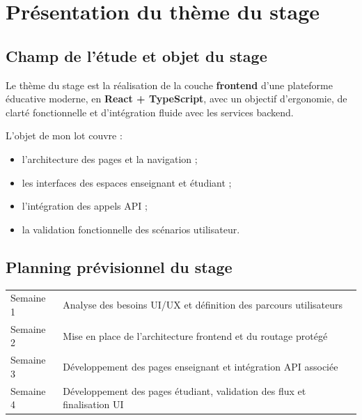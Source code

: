 \chapter{Présentation du thème du stage}

\section{Champ de l'étude et objet du stage}
Le thème du stage est la réalisation de la couche \textbf{frontend} d'une plateforme éducative moderne, en \textbf{React + TypeScript}, avec un objectif d'ergonomie, de clarté fonctionnelle et d'intégration fluide avec les services backend.

L'objet de mon lot couvre :
\begin{itemize}
	\item l'architecture des pages et la navigation ;
	\item les interfaces des espaces enseignant et étudiant ;
	\item l'intégration des appels API ;
	\item la validation fonctionnelle des scénarios utilisateur.
\end{itemize}

\section{Planning prévisionnel du stage}
\begin{longtable}{p{}p{}}
\toprule
Semaine 1 & Analyse des besoins UI/UX et définition des parcours utilisateurs \\
Semaine 2 & Mise en place de l'architecture frontend et du routage protégé \\
Semaine 3 & Développement des pages enseignant et intégration API associée \\
Semaine 4 & Développement des pages étudiant, validation des flux et finalisation UI \\
\bottomrule
\end{longtable}
